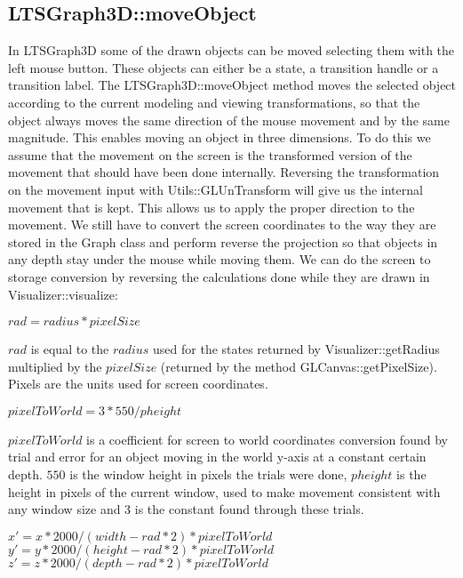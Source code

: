 \documentclass[a4paper]{article}
\begin{document}
\subsection{LTSGraph3D::moveObject}
In LTSGraph3D some of the drawn objects can be moved selecting them with the left mouse button. These objects can either be a state, a transition handle or a transition label. The LTSGraph3D::moveObject method moves the selected object according to the current modeling and viewing transformations, so that the object always moves the same direction of the mouse movement and by the same magnitude. This enables moving an object in three dimensions. To do this we assume that the movement on the screen is the transformed version of the movement that should have been done internally. Reversing the transformation on the movement input with Utils::GLUnTransform will give us the internal movement that is kept. This allows us to apply the proper direction to the movement. We still have to convert the screen coordinates to the way they are stored in the Graph class and perform reverse the projection so that objects in any depth stay under the mouse while moving them. We can do the screen to storage conversion by reversing the calculations done while they are drawn in Visualizer::visualize:
\begin{center}
\begin{math}
rad = radius * pixelSize
\end{math}
\end{center}
$rad$ is equal to the $radius$ used for the states returned by Visualizer::getRadius multiplied by the $pixelSize$ (returned by the method GLCanvas::getPixelSize). Pixels are the units used for screen coordinates.
\begin{center}
\begin{math}
pixelToWorld = 3 * 550 / pheight 
\end{math}
\end{center}
$pixelToWorld$ is a coefficient for screen to world coordinates conversion found by trial and error for an object moving in the world y-axis at a constant certain depth. $550$ is the window height in pixels the trials were done, $pheight$ is the height in pixels of the current window, used to make movement consistent with any window size and 3 is the constant found through these trials.
\begin{center}
\begin{math}
x' = x * 2000 / (width - rad * 2) * pixelToWorld	
\end{math}
\begin{math}
y' = y * 2000 / (height - rad * 2) * pixelToWorld	
\end{math}
\begin{math}
z' = z * 2000 / (depth - rad * 2)	* pixelToWorld
\end{math}
\end{center}
\end{document}
